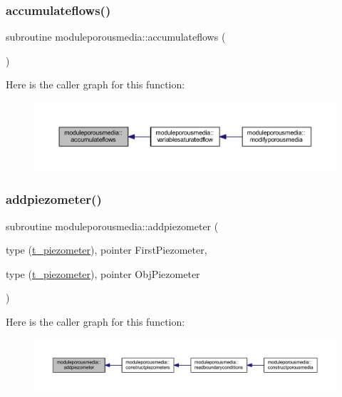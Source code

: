 \subsubsection{\texorpdfstring{accumulateflows()}{accumulateflows()}}
{\footnotesize\ttfamily subroutine moduleporousmedia\+::accumulateflows (\begin{DoxyParamCaption}{ }\end{DoxyParamCaption})\hspace{0.3cm}{\ttfamily [private]}}

Here is the caller graph for this function\+:\nopagebreak
\begin{figure}[H]
\begin{center}
\leavevmode
\includegraphics[width=350pt]{namespacemoduleporousmedia_a96f689b9636ed899f8e42b8e37d1e63d_icgraph}
\end{center}
\end{figure}
\mbox{\label{namespacemoduleporousmedia_a367419c3e235d10645f9a8ef04d062b8}} 
\subsubsection{\texorpdfstring{addpiezometer()}{addpiezometer()}}
{\footnotesize\ttfamily subroutine moduleporousmedia\+::addpiezometer (\begin{DoxyParamCaption}\item[{type (\mbox{\hyperlink{structmoduleporousmedia_1_1t__piezometer}{t\+\_\+piezometer}}), pointer}]{First\+Piezometer,  }\item[{type (\mbox{\hyperlink{structmoduleporousmedia_1_1t__piezometer}{t\+\_\+piezometer}}), pointer}]{Obj\+Piezometer }\end{DoxyParamCaption})\hspace{0.3cm}{\ttfamily [private]}}

Here is the caller graph for this function\+:\nopagebreak
\begin{figure}[H]
\begin{center}
\leavevmode
\includegraphics[width=350pt]{namespacemoduleporousmedia_a367419c3e235d10645f9a8ef04d062b8_icgraph}
\end{center}
\end{figure}
\mbox{\label{namespacemoduleporousmedia_a52ed3f752ac2299db63f80ea0dca19d2}} 
